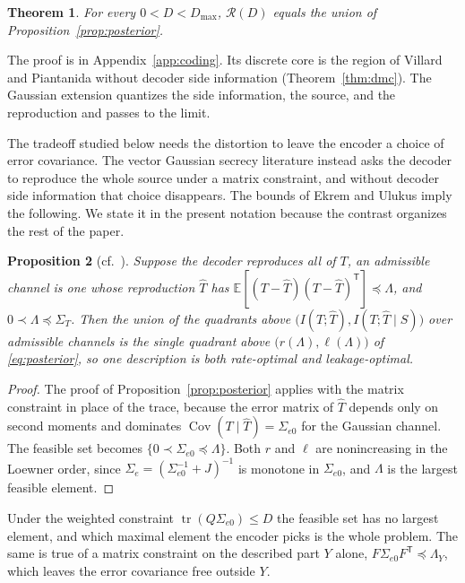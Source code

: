 \documentclass[11pt,onecolumn]{IEEEtran}
\newtheorem{theorem}{Theorem}
\newtheorem{proposition}[theorem]{Proposition}
\newcommand{\E}{\mathbb{E}}
\newcommand{\tr}{\operatorname{tr}}
\newcommand{\Cov}{\operatorname{Cov}}
\newcommand{\RW}{\mathcal{R}}
\newcommand{\Se}{\Sigma_{e}}
\newcommand{\Sez}{\Sigma_{e0}}
\begin{document}
\begin{theorem}\label{thm:op}
For every $0<D<D_{\max}$, $\RW(D)$ equals the union of
Proposition~\ref{prop:posterior}.
\end{theorem}

The proof is in Appendix~\ref{app:coding}. Its discrete core is the
region of Villard and Piantanida without decoder side information
(Theorem~\ref{thm:dmc}). The Gaussian extension quantizes the side
information, the source, and the reproduction and passes to the limit.

The tradeoff studied below needs the distortion to leave the encoder a
choice of error covariance. The vector Gaussian secrecy literature
\cite{ekrem2013,xu2024} instead asks the decoder to reproduce the
whole source under a matrix constraint, and without decoder side
information that choice disappears. The bounds of Ekrem and Ulukus
imply the following. We state it in the present notation because the
contrast organizes the rest of the paper.

\begin{proposition}[cf.~{\cite[Thms.~6--7]{ekrem2013}}]\label{prop:matrix}
Suppose the decoder reproduces all of $T$, an admissible channel is one
whose reproduction $\hat T$ has
$\E[(T-\hat T)(T-\hat T)^{\mathsf T}]\preceq\Lambda$, and
$0\prec\Lambda\preceq\Sigma_T$. Then the union of the quadrants above
$\bigl(I(T;\hat T),I(T;\hat T\mid S)\bigr)$ over admissible channels is
the single quadrant above $\bigl(r(\Lambda),\ell(\Lambda)\bigr)$ of
\eqref{eq:posterior}, so one description is both rate-optimal and
leakage-optimal.
\end{proposition}

\begin{proof}
The proof of Proposition~\ref{prop:posterior} applies with the matrix
constraint in place of the trace, because the error matrix of $\hat T$
depends only on second moments and dominates $\Cov(T\mid\hat T)=\Sez$
for the Gaussian channel. The feasible set becomes
$\{0\prec\Sez\preceq\Lambda\}$. Both $r$ and $\ell$ are nonincreasing in
the Loewner order, since $\Se=(\Sez^{-1}+J)^{-1}$ is monotone in $\Sez$,
and $\Lambda$ is the largest feasible element.
\end{proof}

Under the weighted constraint $\tr(Q\Sez)\le D$ the feasible set has no
largest element, and which maximal element the encoder picks is the
whole problem. The same is true of a matrix constraint on the described
part $Y$ alone, $F\Sez F^{\mathsf T}\preceq\Lambda_Y$, which leaves the
error covariance free outside $Y$.
\end{document}
